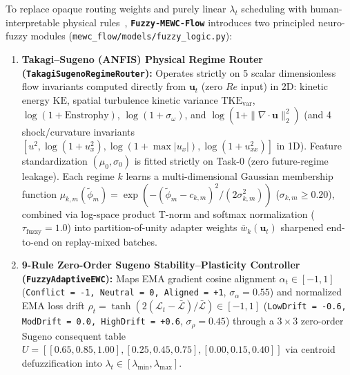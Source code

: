 \documentclass[11pt,a4paper]{article}
\begin{document}
To replace opaque routing weights and purely linear $\lambda_t$ scheduling with human-interpretable physical rules~\cite{mamdani1974fuzzy,takagi1985fuzzy,jang1993anfis}, \textbf{\texttt{Fuzzy-MEWC-Flow}} introduces two principled neuro-fuzzy modules (\texttt{mewc\_flow/models/fuzzy\_logic.py}):
\begin{enumerate}
  \item \textbf{Takagi--Sugeno (ANFIS) Physical Regime Router (\texttt{TakagiSugenoRegimeRouter}):} Operates strictly on 5 scalar dimensionless flow invariants computed directly from $\mathbf{u}_t$ (zero $Re$ input) in 2D: kinetic energy $\text{KE}$, spatial turbulence kinetic variance $\text{TKE}_{\text{var}}$, $\log(1 + \text{Enstrophy})$, $\log(1 + \sigma_{\omega})$, and $\log(1 + \|\nabla\cdot\mathbf{u}\|_2^2)$ (and 4 shock/curvature invariants $[u^2, \log(1+u_x^2), \log(1+\max|u_x|), \log(1+u_{xx}^2)]$ in 1D). Feature standardization $(\mu_0, \sigma_0)$ is fitted strictly on Task-0 (zero future-regime leakage). Each regime $k$ learns a multi-dimensional Gaussian membership function $\mu_{k,m}(\tilde{\phi}_m) = \exp(-(\tilde{\phi}_m - c_{k,m})^2 / (2\sigma_{k,m}^2))$ ($\sigma_{k,m} \ge 0.20$), combined via log-space product T-norm and softmax normalization ($\tau_{\text{fuzzy}} = 1.0$) into partition-of-unity adapter weights $\bar{w}_k(\mathbf{u}_t)$ sharpened end-to-end on replay-mixed batches.
  \item \textbf{9-Rule Zero-Order Sugeno Stability--Plasticity Controller (\texttt{FuzzyAdaptiveEWC}):} Maps EMA gradient cosine alignment $\alpha_t \in [-1, 1]$ (\texttt{Conflict = -1, Neutral = 0, Aligned = +1}, $\sigma_{\alpha} = 0.55$) and normalized EMA loss drift $\rho_t = \tanh(2(\mathcal{L}_t - \bar{\mathcal{L}}) / \bar{\mathcal{L}}) \in [-1, 1]$ (\texttt{LowDrift = -0.6, ModDrift = 0.0, HighDrift = +0.6}, $\sigma_{\rho} = 0.45$) through a $3 \times 3$ zero-order Sugeno consequent table $U = [[0.65, 0.85, 1.00], [0.25, 0.45, 0.75], [0.00, 0.15, 0.40]]$ via centroid defuzzification into $\lambda_t \in [\lambda_{\min}, \lambda_{\max}]$.
\end{enumerate}
\end{document}
